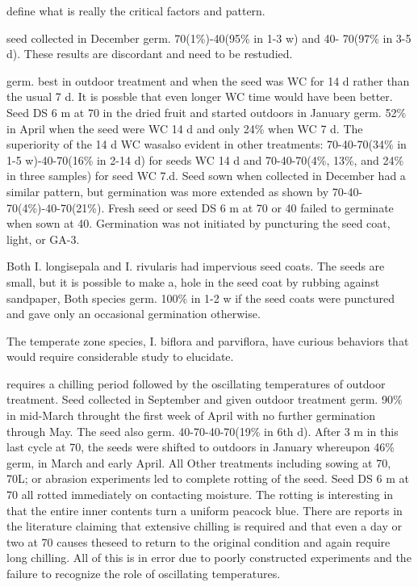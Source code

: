 \begin{description}
define what is really the critical factors and pattern.
\item[I. serrata] seed collected in December germ. 70(1\%)-40(95\% in 1-3 w) and 40-
70(97\% in 3-5 d). These results are discordant and need to be restudied.
\item[I. verticillata] germ. best in outdoor treatment and when the seed was WC for 14
d rather than the usual 7 d. It is possble that even longer WC time would have been
better. Seed DS 6 m at 70 in the dried fruit and started outdoors in January germ. 52\%
in April when the seed were WC 14 d and only 24\% when WC 7 d. The superiority of
the 14 d WC wasalso evident in other treatments: 70-40-70(34\% in 1-5 w)-40-70(16\%
in 2-14 d) for seeds WC 14 d and 70-40-70(4\%, 13\%, and 24\% in three samples) for
seed WC 7.d. Seed sown when collected in December had a similar pattern, but
germination was more extended as shown by 70-40-70(4\%)-40-70(21\%). Fresh seed
or seed DS 6 m at 70 or 40 failed to germinate when sown at 40. Germination was not
initiated by puncturing the seed coat, light, or GA-3.
\item[Illiamna (Malvaceae)] Both I. longisepala and I. rivularis had impervious
seed coats. The seeds are small, but it is possible to make a, hole in the seed coat by
rubbing against sandpaper, Both species germ. 100\% in 1-2 w if the seed coats were
punctured and gave only an occasional germination otherwise.

\item[Impatiens (Balsamaceae)] The temperate zone species, I. biflora and
parviflora, have curious behaviors that would require considerable study to elucidate.

\item[I. biflora] requires a chilling period followed by the oscillating temperatures of
outdoor treatment. Seed collected in September and given outdoor treatment germ.
90\% in mid-March throught the first week of April with no further germination through
May. The seed also germ. 40-70-40-70(19\% in 6th d). After 3 m in this last cycle at 70,
the seeds were shifted to outdoors in January whereupon 46\% germ, in March and
early April. All Other treatments including sowing at 70, 70L; or abrasion experiments
led to complete rotting of the seed. Seed DS 6 m at 70 all rotted immediately on
contacting moisture. The rotting is interesting in that the entire inner contents turn a
uniform peacock blue. There are reports in the literature claiming that extensive
chilling is required and that even a day or two at 70 causes theseed to return to the
original condition and again require long chilling. All of this is in error due to poorly
constructed experiments and the failure to recognize the role of oscillating
temperatures.


\end{description}
